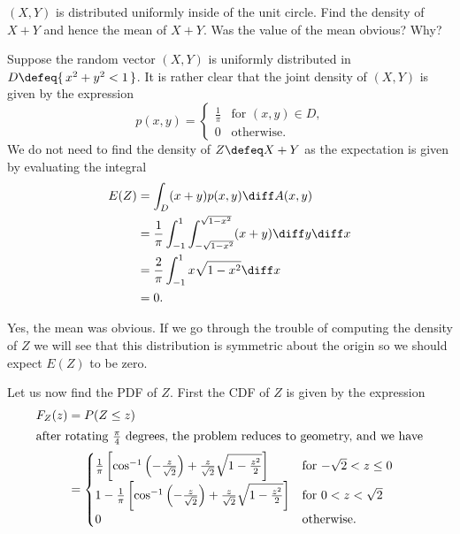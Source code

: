 \begin{problem}[Handout 18, \# 15]
  \((X,Y)\) is distributed uniformly inside of the unit circle. Find the
  density of \(X+Y\) and hence the mean of \(X+Y\). Was the value of the
  mean obvious? Why?
\end{problem}
\begin{solution}
  Suppose the random vector \((X,Y)\) is uniformly distributed in
  \(D\defeq \{\,x^2+y^2<1\,\}\). It is rather clear that the joint density
  of \((X,Y)\) is given by the expression
  \[
    p(x,y)=
    \begin{cases}
      \frac{1}{\pi}&\text{for \((x,y)\in D\),}\\
      0&\text{otherwise.}
    \end{cases}
  \]
  We do not need to find the density of \(Z\defeq X+Y\) as the expectation
  is given by evaluating the integral
  \begin{align*}
    E(Z)
    &=\int_D (x+y)p(x,y)\diff A(x,y)\\
    &=\frac{1}{\pi}\int_{-1}^1\int_{-\sqrt{1-x^2}}^{\sqrt{1-x^2}} (x+y)\diff
      y\diff x\\
    &=\frac{2}{\pi}\int_{-1}^1x\sqrt{1-x^2}\diff x\\
    &=0.
  \end{align*}

  Yes, the mean was obvious. If we go through the trouble of computing the
  density of \(Z\) we will see that this distribution is symmetric about
  the origin so we should expect \(E(Z)\) to be zero.

  Let us now find the PDF of \(Z\). First the CDF of \(Z\) is given by the
  expression
  \begin{align*}
    F_Z(z)
    &=P(Z\leq z)\\
    \intertext{after rotating \(\frac{\pi}{4}\) degrees, the problem
    reduces to geometry, and we have}
    &=
      \begin{cases}
        \frac{1}{\pi}\left[\cos^{-1}\left(-\frac{z}{\sqrt{2}}\right)+\frac{z}{\sqrt{2}}\sqrt{1-\frac{z^2}{2}}\right]
        &\text{for \(-\sqrt{2}<z\leq 0\)}\\
        1-\frac{1}{\pi}\left[\cos^{-1}\left(-\frac{z}{\sqrt{2}}\right)+\frac{z}{\sqrt{2}}\sqrt{1-\frac{z^2}{2}}\right]
        &\text{for \(0<z<\sqrt{2}\)}\\
        0&\text{otherwise.}
      \end{cases}
  \end{align*}
\end{solution}
\newpage

